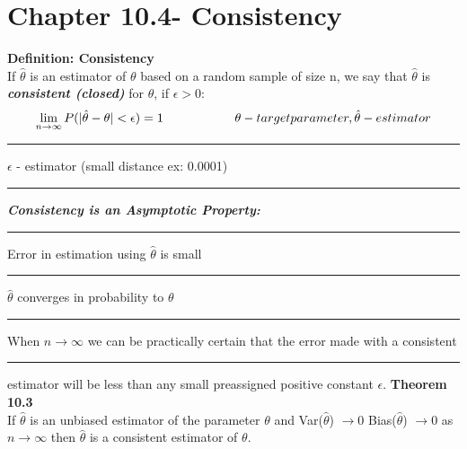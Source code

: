\documentclass[]{article}
\begin{document}
\section{Chapter 10.4- Consistency}
\Large\textbf{Definition: Consistency}
\\
\Large If $\hat\theta$ is an estimator of $\theta$ based on a random sample of size n, we say that $\hat\theta$ is \textbf{\textit{consistent (closed)}} for $\theta$, if $\epsilon > 0$:   
\newline \[ \lim_{n\to\infty} P( |  \hat\theta - \theta | < \epsilon) = 1   \Large\rule{2cm}{0pt}  \theta - target parameter,  \hat\theta - estimator \] 
\Large\rule{9cm}{0pt}  $\epsilon$ - estimator (small distance ex: 0.0001)
\newline
\newline 
\Large\rule{1cm}{0pt}\textbf{\textit{Consistency is an Asymptotic Property:}}
\newline\Large\rule{1cm}{0pt} Error in estimation using $\hat\theta$ is small 
\newline\Large\rule{1cm}{0pt} $\hat\theta$ converges in probability to $\theta$
\newline\Large\rule{1cm}{0pt} When ${n\to\infty}$ we can be practically certain that the error made with a consistent 
\newline\Large\rule{1cm}{0pt} estimator will be less than any small preassigned positive constant $\epsilon$.
\newline
\newline 
\Large\textbf{Theorem 10.3   }
\\
\Large If $\hat\theta$ is an unbiased estimator of the parameter $\theta$ and  Var($\hat\theta$) $\to 0$ Bias($\hat\theta$) $\to 0$ as  ${n\to\infty}$ then $\hat\theta$ is a consistent estimator of $\theta$.


\newpage
\end{document}
